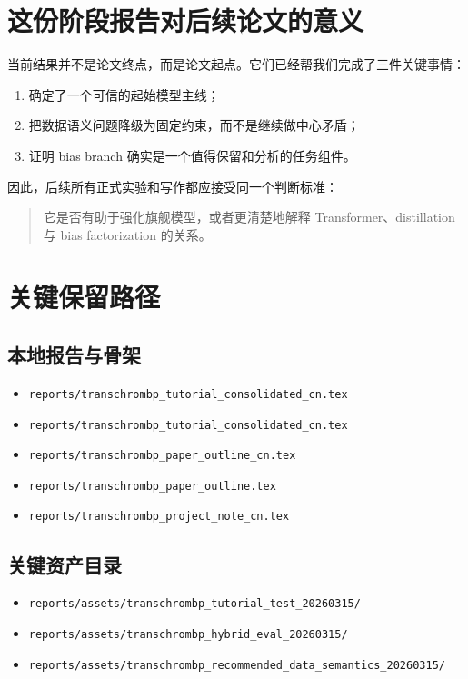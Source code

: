 \documentclass[11pt,a4paper]{ctexart}
\begin{document}
\section{这份阶段报告对后续论文的意义}

当前结果并不是论文终点，而是论文起点。它们已经帮我们完成了三件关键事情：
\begin{enumerate}[leftmargin=2em]
  \item 确定了一个可信的起始模型主线；
  \item 把数据语义问题降级为固定约束，而不是继续做中心矛盾；
  \item 证明 bias branch 确实是一个值得保留和分析的任务组件。
\end{enumerate}

因此，后续所有正式实验和写作都应接受同一个判断标准：
\begin{quote}
它是否有助于强化旗舰模型，或者更清楚地解释 Transformer、distillation 与 bias factorization
 的关系。
\end{quote}

\section{关键保留路径}

\subsection*{本地报告与骨架}
\begin{itemize}[leftmargin=2em]
  \item \texttt{reports/transchrombp\_tutorial\_consolidated\_cn.tex}
  \item \texttt{reports/transchrombp\_tutorial\_consolidated\_cn.tex}
  \item \texttt{reports/transchrombp\_paper\_outline\_cn.tex}
  \item \texttt{reports/transchrombp\_paper\_outline.tex}
  \item \texttt{reports/transchrombp\_project\_note\_cn.tex}
\end{itemize}

\subsection*{关键资产目录}
\begin{itemize}[leftmargin=2em]
  \item \texttt{reports/assets/transchrombp\_tutorial\_test\_20260315/}
  \item \texttt{reports/assets/transchrombp\_hybrid\_eval\_20260315/}
  \item \texttt{reports/assets/transchrombp\_recommended\_data\_semantics\_20260315/}
\end{itemize}
\end{document}
